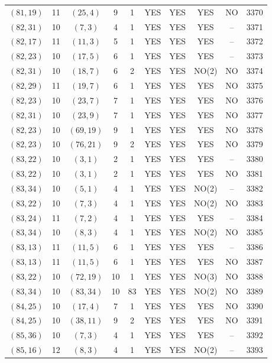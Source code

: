\begin{longtable}{|c|c|c|c|c|c|c|c|c|c|}
$(81, 19)$ & 11 & $(25, 4)$ & 9 & 1 & YES & YES & YES & NO & 3370\\
$(82, 31)$ & 10 & $(7, 3)$ & 4 & 1 & YES & YES & YES & -- & 3371\\
$(82, 17)$ & 11 & $(11, 3)$ & 5 & 1 & YES & YES & YES & -- & 3372\\
$(82, 23)$ & 10 & $(17, 5)$ & 6 & 1 & YES & YES & YES & -- & 3373\\
$(82, 31)$ & 10 & $(18, 7)$ & 6 & 2 & YES & YES & NO(2) & NO & 3374\\
$(82, 29)$ & 11 & $(19, 7)$ & 6 & 1 & YES & YES & YES & NO & 3375\\
$(82, 23)$ & 10 & $(23, 7)$ & 7 & 1 & YES & YES & YES & NO & 3376\\
$(82, 31)$ & 10 & $(23, 9)$ & 7 & 1 & YES & YES & YES & NO & 3377\\
$(82, 23)$ & 10 & $(69, 19)$ & 9 & 1 & YES & YES & YES & NO & 3378\\
$(82, 23)$ & 10 & $(76, 21)$ & 9 & 2 & YES & YES & YES & NO & 3379\\
$(83, 22)$ & 10 & $(3, 1)$ & 2 & 1 & YES & YES & YES & -- & 3380\\
$(83, 22)$ & 10 & $(3, 1)$ & 2 & 1 & YES & YES & YES & NO & 3381\\
$(83, 34)$ & 10 & $(5, 1)$ & 4 & 1 & YES & YES & NO(2) & -- & 3382\\
$(83, 22)$ & 10 & $(7, 3)$ & 4 & 1 & YES & YES & NO(2) & NO & 3383\\
$(83, 24)$ & 11 & $(7, 2)$ & 4 & 1 & YES & YES & YES & -- & 3384\\
$(83, 34)$ & 10 & $(8, 3)$ & 4 & 1 & YES & YES & NO(2) & NO & 3385\\
$(83, 13)$ & 11 & $(11, 5)$ & 6 & 1 & YES & YES & YES & -- & 3386\\
$(83, 13)$ & 11 & $(11, 5)$ & 6 & 1 & YES & YES & YES & NO & 3387\\
$(83, 22)$ & 10 & $(72, 19)$ & 10 & 1 & YES & YES & NO(3) & NO & 3388\\
$(83, 34)$ & 10 & $(83, 34)$ & 10 & 83 & YES & YES & NO(2) & NO & 3389\\
$(84, 25)$ & 10 & $(17, 4)$ & 7 & 1 & YES & YES & YES & NO & 3390\\
$(84, 25)$ & 10 & $(38, 11)$ & 9 & 2 & YES & YES & YES & NO & 3391\\
$(85, 36)$ & 10 & $(7, 3)$ & 4 & 1 & YES & YES & YES & -- & 3392\\
$(85, 16)$ & 12 & $(8, 3)$ & 4 & 1 & YES & YES & NO(2) & -- & 3393\\

\end{longtable}
